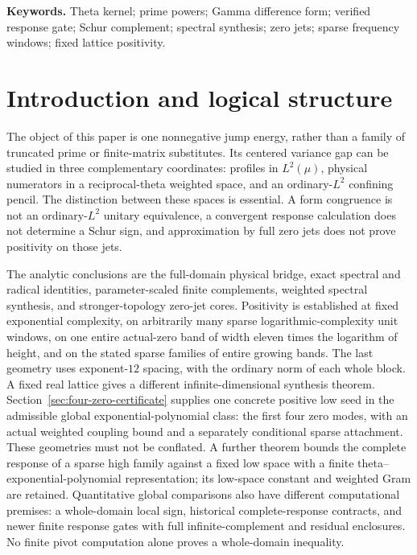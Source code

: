 \documentclass[11pt,a4paper]{article}
\numberwithin{equation}{section}
\theoremstyle{definition}\newtheorem{definition}[theorem]{Definition}
\theoremstyle{remark}\newtheorem{remark}[theorem]{Remark}
\begin{document}
\begin{abstract}
multiple of this scale gives eventual positivity; Appendix~\ref{app:growing-zero-bands} retains the precise hypotheses and full proof. These restricted positivity results do not establish positivity on arbitrary unions or the full zero family. The global half inequality and the Riemann hypothesis remain unproved.
\end{abstract}
\noindent\textbf{Keywords.} Theta kernel; prime powers; Gamma difference form; verified response gate; Schur complement; spectral synthesis; zero jets; sparse frequency windows; fixed lattice positivity.
\clearpage\setcounter{tocdepth}{1}\tableofcontents\clearpage

\section{Introduction and logical structure}\label{sec:intro}
The object of this paper is one nonnegative jump energy, rather than a family of truncated prime or finite-matrix substitutes. Its centered variance gap can be studied in three complementary coordinates: profiles in $L^2(\mu)$, physical numerators in a reciprocal-theta weighted space, and an ordinary-$L^2$ confining pencil. The distinction between these spaces is essential. A form congruence is not an ordinary-$L^2$ unitary equivalence, a convergent response calculation does not determine a Schur sign, and approximation by full zero jets does not prove positivity on those jets.

The analytic conclusions are the full-domain physical bridge, exact spectral and radical identities, parameter-scaled finite complements, weighted spectral synthesis, and stronger-topology zero-jet cores. Positivity is established at fixed exponential complexity, on arbitrarily many sparse logarithmic-complexity unit windows, on one entire actual-zero band of width eleven times the logarithm of height, and on the stated sparse families of entire growing bands. The last geometry uses exponent-$12$ spacing, with the ordinary norm of each whole block. A fixed real lattice gives a different infinite-dimensional synthesis theorem. Section~\ref{sec:four-zero-certificate} supplies one concrete positive low seed in the admissible global exponential-polynomial class: the first four zero modes, with an actual weighted coupling bound and a separately conditional sparse attachment. These geometries must not be conflated. A further theorem bounds the complete response of a sparse high family against a fixed low space with a finite theta--exponential-polynomial representation; its low-space constant and weighted Gram are retained. Quantitative global comparisons also have different computational premises: a whole-domain local sign, historical complete-response contracts, and newer finite response gates with full infinite-complement and residual enclosures. No finite pivot computation alone proves a whole-domain inequality.
\end{document}
